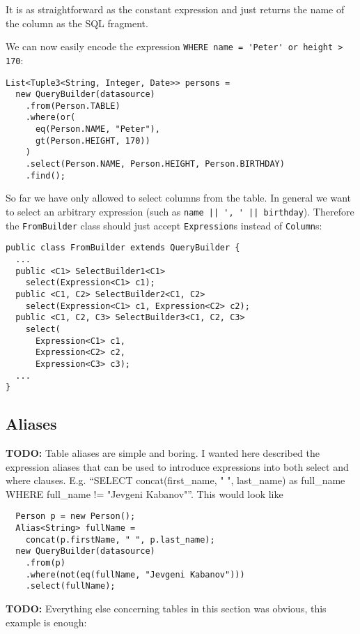 \documentclass{sig-alternate}
\begin{document}
It is as straightforward as the constant expression and just returns the name of the column as the SQL fragment.

We can now easily encode the expression \verb!WHERE name = 'Peter' or height > 170!:

\begin{verbatim}
List<Tuple3<String, Integer, Date>> persons = 
  new QueryBuilder(datasource)
    .from(Person.TABLE)
    .where(or(
      eq(Person.NAME, "Peter"),
      gt(Person.HEIGHT, 170))
    )
    .select(Person.NAME, Person.HEIGHT, Person.BIRTHDAY)
    .find();
\end{verbatim}


So far we have only allowed to select columns from the table. In general we want to select an arbitrary expression (such as \verb!name || ', ' || birthday!). Therefore the \verb!FromBuilder! class should just accept \verb!Expression!s instead of \verb!Column!s:

\begin{verbatim}
public class FromBuilder extends QueryBuilder {
  ...
  public <C1> SelectBuilder1<C1> 
    select(Expression<C1> c1);
  public <C1, C2> SelectBuilder2<C1, C2> 
    select(Expression<C1> c1, Expression<C2> c2);
  public <C1, C2, C3> SelectBuilder3<C1, C2, C3> 
    select(
      Expression<C1> c1, 
      Expression<C2> c2, 
      Expression<C3> c3);
  ...
}
\end{verbatim}


\subsection{Aliases}

\textbf{TODO:} Table aliases are simple and boring. I wanted here described the expression aliases that can be used to introduce expressions into both select and where clauses. E.g. ``SELECT concat(first\_name, " ", last\_name) as full\_name WHERE full\_name != "Jevgeni Kabanov"''. This would look like 
\begin{verbatim}
  Person p = new Person();
  Alias<String> fullName = 
    concat(p.firstName, " ", p.last_name);
  new QueryBuilder(datasource)
    .from(p)
    .where(not(eq(fullName, "Jevgeni Kabanov")))
    .select(fullName);
\end{verbatim}

\textbf{TODO:} Everything else concerning tables in this section was obvious, this example is enough:
\end{document}
